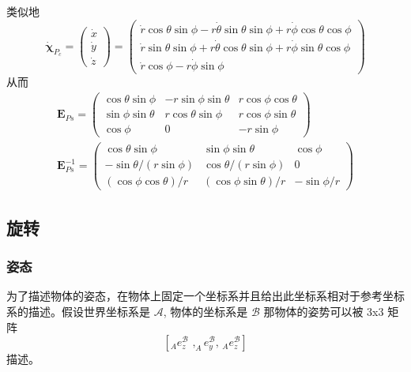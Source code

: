 \documentclass[11pt]{ctexart}
\begin{document}
类似地
\begin{equation}
\dot{\boldsymbol{\chi}}_{P_{c}}=\left(\begin{array}{c}{\dot{x}}\\{\dot{y}}\\{\dot{z}}\end{array}\right)=\left(\begin{array}{c}{\dot{r}\cos\theta\sin\phi-r\dot{\theta}\sin\theta\sin\phi+r\dot{\phi}\cos\theta\cos\phi}\\{\dot{r}\sin\theta\sin\phi+r\dot{\theta}\cos\theta\sin\phi+r\dot{\phi}\sin\theta\cos\phi}\\{\dot{r}\cos\phi-r\dot{\phi}\sin\phi}\end{array}\right) 
\end{equation}
从而
\begin{equation}
\begin{gathered}
    \mathbf{E}_{Ps}= \left(\begin{array}{ccc}\cos\theta\sin\phi&-r\sin\phi\sin\theta&r\cos\phi\cos\theta\\\sin\phi\sin\theta&r\cos\theta\sin\phi&r\cos\phi\sin\theta\\\cos\phi&0&-r\sin\phi\end{array}\right) \\
    \mathbf{E}_{Ps}^{-1}= \left(\begin{array}{ccc}\cos\theta\sin\phi&\sin\phi\sin\theta&\cos\phi\\-\sin\theta/(r\sin\phi)&\cos\theta/(r\sin\phi)&0\\(\cos\phi\cos\theta)/r&(\cos\phi\sin\theta)/r&-\sin\phi/r\end{array}\right) 
\end{gathered}
\end{equation}

\subsection{旋转}
\subsubsection{姿态}
为了描述物体的姿态，在物体上固定一个坐标系并且给出此坐标系相对于参考坐标系的描述。假设世界坐标系是 $\mathcal{A}$, 物体的坐标系是 $\mathcal{B}$ 那物体的姿势可以被 3x3 矩阵
\begin{equation}
\left[ _Ae_z^{\mathcal{B}}\,\,, _Ae_y^{\mathcal{B}},\, _Ae_z^{\mathcal{B}} \right] 
\end{equation}
描述。
\end{document}
